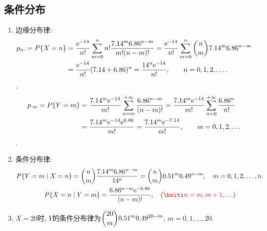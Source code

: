 \subsection{条件分布}
\setcounter{prob}{10}
\begin{prob}
	\begin{enumerate}
		\item
		边缘分布律:
		\begin{align*}
			p_{n\cdot}=P\{X=n\}&=\frac{\mathrm{e}^{-14}}{n!}\sum_{m=0}^n n!\frac{7.14^m 6.86^{n-m}}{m!(n-m)!}
			=\frac{\mathrm{e}^{-14}}{n!}\sum_{m=0}^n{n\choose m}7.14^m 6.86^{n-m}\\
			&=\frac{\mathrm{e}^{-14}}{n!}(7.14+6.86)^n = \frac{14^n\mathrm{e}^{-14}}{n!}, \qquad n=0,1,2,\ldots.
		\end{align*}
		.
		\begin{align*}
			p_{\cdot m}=P\{Y=m\}&=\frac{7.14^m \mathrm{e}^{-14}}{m!}\sum_{n=m}^{+\infty} \frac{6.86^{n-m}}{(n-m)!}
			=\frac{7.14^m \mathrm{e}^{-14}}{m!}\sum_{n=0}^{+\infty}\frac{6.86^n}{n!}\\
			&=\frac{7.14^m \mathrm{e}^{-14}\mathrm{e}^{6.86}}{m!}=\frac{7.14^m \mathrm{e}^{-7.14}}{m!}, \qquad m=0,1,2,\ldots
		\end{align*}
		.
		\item
		条件分布律:
		\begin{gather*}
			P\{Y=m\mid X=n\}={n\choose m}\frac{7.14^m 6.86^{n-m}}{14^n}={n\choose m}0.51^m 0.49^{n-m},\quad m=0,1,2,\ldots,n.\\
			P\{X=n\mid Y=m\}=\frac{6.86^{n-m}\e^{-6.86}}{(n-m)!},\quad (\red{n=m,m+1,\ldots})
		\end{gather*}
		\item
		$X=20$时, $Y$的条件分布律为$\displaystyle {20\choose m}0.51^m 0.49^{20-m}$, $m=0,1,\ldots,20$.
	\end{enumerate}
\end{prob}
